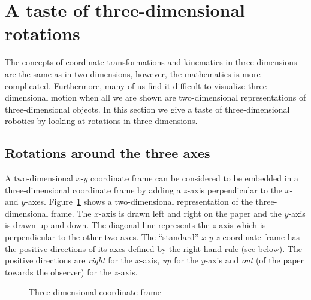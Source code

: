 
\section{A taste of three-dimensional rotations}\label{s.three}

The concepts of coordinate transformations and kinematics in three-dimensions are the same as in two dimensions, however, the mathematics is more complicated. Furthermore, many of us find it difficult to visualize three-dimensional motion when all we are shown are two-dimensional representations of three-dimensional objects. In this section we give a taste of three-dimensional robotics by looking at rotations in three dimensions.

\subsection{Rotations around the three axes}\label{s.rotation-notation}

A two-dimensional $x$-$y$ coordinate frame can be considered to be embedded in a three-dimensional coordinate frame by adding a $z$-axis perpendicular to the $x$- and $y$-axes. Figure~\ref{fig.frame} shows a two-dimensional representation of the three-dimensional frame. The $x$-axis is drawn left and right on the paper and the $y$-axis is drawn up and down. The diagonal line represents the $z$-axis which is perpendicular to the other two axes. The ``standard'' $x$-$y$-$z$ coordinate frame has the positive directions of its axes defined by the right-hand rule (see below). The positive directions are \textit{right} for the $x$-axis, \textit{up} for the $y$-axis and \textit{out} (of the paper towards the observer) for the $z$-axis. 

\begin{figure}
\begin{center}
\caption{Three-dimensional coordinate frame}\label{fig.frame}
\end{center}
\end{figure}

